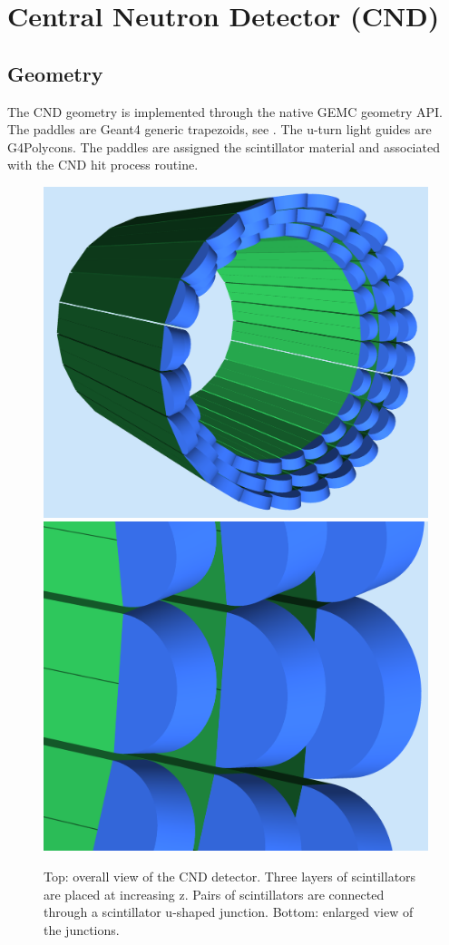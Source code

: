 \section{Central Neutron Detector (CND)}

\subsection{Geometry}

The CND geometry is implemented through the native GEMC geometry API.
The paddles are Geant4 generic trapezoids, see . The u-turn light guides are G4Polycons.
The paddles are assigned the scintillator material and associated with the CND hit process routine.

\begin{figure}
	\centering
	\includegraphics[width=0.95\columnwidth,keepaspectratio]{img/cndGeometry.png}
	\includegraphics[width=0.95\columnwidth,keepaspectratio]{img/cndDetail.png}
	\caption{Top: overall view of the CND detector. Three layers of scintillators are placed at increasing z. Pairs of scintillators
            are connected through a scintillator u-shaped junction. Bottom: enlarged view of the junctions. }
	\label{fig:cndGeometry}
\end{figure}


